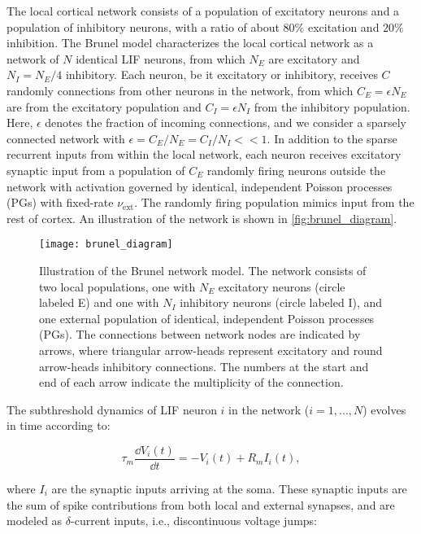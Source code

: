 The local cortical network consists of a population of excitatory neurons and a population of inhibitory neurons, with a ratio of about $80\%$ excitation and $20\%$ inhibition. The Brunel model characterizes the local cortical network as a network of $N$ identical LIF neurons, from which $N_E$ are excitatory and $N_I = N_E / 4$ inhibitory. Each neuron, be it excitatory or inhibitory, receives $C$ randomly connections from other neurons in the network, from which $C_E = \epsilon N_E$ are from the excitatory population and $C_I = \epsilon N_I$ from the inhibitory population. Here, $\epsilon$ denotes the fraction of incoming connections, and we consider a sparsely connected network with $\epsilon = C_E / N_E = C_I / N_I << 1$. In addition to the sparse recurrent inputs from within the local network, each neuron receives excitatory synaptic input from a population of $C_E$ randomly firing neurons outside the network with activation governed by identical, independent Poisson processes (PGs) with fixed-rate $\nu_\mathrm{ext}$. The randomly firing population mimics input from the rest of cortex. An illustration of the network is shown in \autoref{fig:brunel_diagram}.

\begin{figure}[!htb]
    \centering
    \texttt{[image: brunel\_diagram]}
    \caption{Illustration of the Brunel network model. The network consists of two local populations, one with $N_E$ excitatory neurons (circle labeled E) and one with $N_I$ inhibitory neurons (circle labeled I), and one external population of identical, independent Poisson processes (PGs). The connections between network nodes are indicated by arrows, where triangular arrow-heads represent excitatory and round arrow-heads inhibitory connections. The numbers at the start and end of each arrow indicate the multiplicity of the connection.
    }
    \label{fig:brunel_diagram}
\end{figure}

The subthreshold dynamics of LIF neuron $i$ in the network ($i=1, ..., N$) evolves in time according to:

\begin{equation}
    \tau_m \frac{\dd{V_i (t)}}{\dd{t}} = - V_i(t) + R_m I_i(t),
\end{equation}

where $I_i$ are the synaptic inputs arriving at the soma. These synaptic inputs are the sum of spike contributions from both local and external synapses, and are modeled as $\delta$-current inputs, i.e., discontinuous voltage jumps: 

